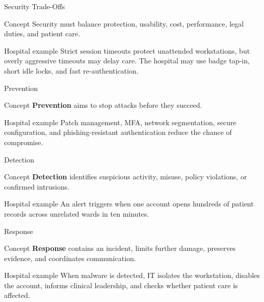 \documentclass[presentation]{beamer}
\begin{document}
\begin{frame}[c]{Security Trade-Offs}
\begin{block}{Concept}
Security must balance protection, usability, cost, performance, legal duties, and patient care.
\end{block}

\begin{exampleblock}{Hospital example}
Strict session timeouts protect unattended workstations, but overly aggressive timeouts may delay
care. The hospital may use badge tap-in, short idle locks, and fast re-authentication.
\end{exampleblock}
\end{frame}

\begin{frame}[c]{Prevention}
\begin{block}{Concept}
\textbf{Prevention} aims to stop attacks before they succeed.
\end{block}

\begin{exampleblock}{Hospital example}
Patch management, MFA, network segmentation, secure configuration, and phishing-resistant
authentication reduce the chance of compromise.
\end{exampleblock}
\end{frame}

\begin{frame}[c]{Detection}
\begin{block}{Concept}
\textbf{Detection} identifies suspicious activity, misuse, policy violations, or confirmed
intrusions.
\end{block}

\begin{exampleblock}{Hospital example}
An alert triggers when one account opens hundreds of patient records across unrelated wards in
ten minutes.
\end{exampleblock}
\end{frame}

\begin{frame}[c]{Response}
\begin{block}{Concept}
\textbf{Response} contains an incident, limits further damage, preserves evidence, and coordinates
communication.
\end{block}

\begin{exampleblock}{Hospital example}
When malware is detected, IT isolates the workstation, disables the account, informs clinical
leadership, and checks whether patient care is affected.
\end{exampleblock}
\end{frame}
\end{document}
